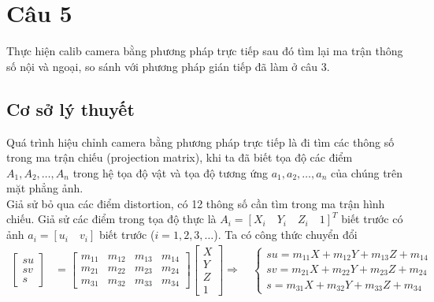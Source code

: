 \section{Câu 5}
     \hspace*{0.6cm}Thực hiện calib camera bằng phương pháp trực tiếp sau đó tìm lại ma trận thông số nội và ngoại, so sánh với phương pháp gián tiếp đã làm ở câu 3.
     \subsection{Cơ sở lý thuyết}
          \hspace*{0.6cm}Quá trình hiệu chỉnh camera bằng phương pháp trực tiếp là đi tìm các thông số trong ma trận chiếu (projection matrix), khi ta đã
          biết tọa độ các điểm $A_1, A_2, \dots, A_n$ trong hệ tọa độ vật và tọa độ tương ứng $a_1, a_2, \dots, a_n$ của chúng trên mặt phẳng ảnh.\\ %
          \hspace*{0.6cm}Giả sử bỏ qua các điểm distortion, có 12 thông số cần tìm trong ma trận hình chiếu. Giả sử các điểm trong tọa độ thực là $A_i = [X_i \quad Y_i \quad Z_i \quad 1]^T$ biết trước có ảnh $a_i = [u_i \quad v_i]$ biết trước ($i = 1, 2, 3, \dots$). Ta có công thức chuyển đổi
          \begin{align}
               \begin{bmatrix}
               su \\
               sv \\
               s
               \end{bmatrix}
               &=
               \begin{bmatrix}
               m_{11} & m_{12} & m_{13} & m_{14} \\
               m_{21} & m_{22} & m_{23} & m_{24} \\
               m_{31} & m_{32} & m_{33} & m_{34}
               \end{bmatrix}
               \begin{bmatrix}
               X \\ Y \\ Z \\ 1
               \end{bmatrix}
               \Rightarrow \quad
               \begin{cases}
               su = m_{11}X + m_{12}Y + m_{13}Z + m_{14} \\
               sv = m_{21}X + m_{22}Y + m_{23}Z + m_{24} \\
               s  = m_{31}X + m_{32}Y + m_{33}Z + m_{34}
               \end{cases}
               \label{c5_eq1}
          \end{align}
